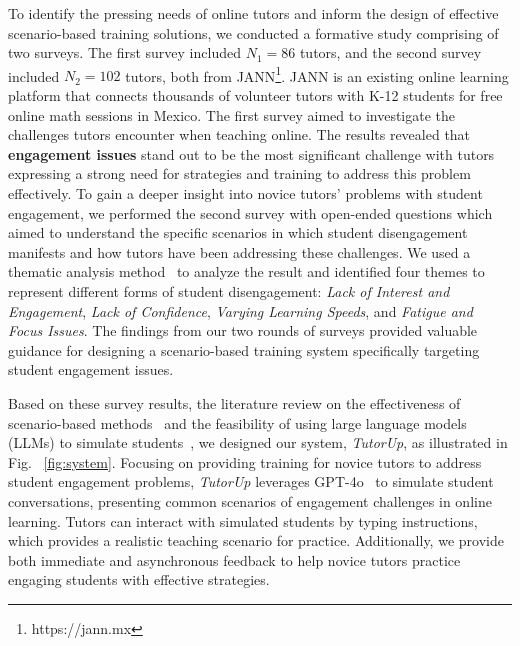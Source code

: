 To identify the pressing needs of online tutors and inform the design of effective scenario-based training solutions, we conducted a formative study comprising of two surveys. The first survey included $N_1 = 86$ tutors, and the second survey included $N_2 = 102$ tutors, both from JANN\footnote{https://jann.mx}. JANN is an existing online learning platform that connects thousands of volunteer tutors with K-12 students for free online math sessions in Mexico. The first survey aimed to investigate the challenges tutors encounter when teaching online. The results revealed that \textbf{engagement issues} stand out to be the most significant challenge with tutors expressing a strong need for strategies and training to address this problem effectively.
To gain a deeper insight into novice tutors' problems with student engagement, we performed the second survey with open-ended questions which aimed to understand the specific scenarios in which student disengagement manifests and how tutors have been addressing these challenges. We used a thematic analysis method~\cite{joffe2011thematic} to analyze the result and identified four themes to represent different forms of student disengagement: \textit{Lack of Interest and Engagement}, \textit{Lack of Confidence}, \textit{Varying Learning Speeds}, and \textit{Fatigue and Focus Issues}. The findings from our two rounds of surveys provided valuable guidance for designing a scenario-based training system specifically targeting student engagement issues.

Based on these survey results, the literature review on the effectiveness of scenario-based methods~\cite{clark2009accelerating,preservice,grossman2008back,adapting,scenariobased,prospectsforchange} and the feasibility of using large language models (LLMs) to simulate students~\cite{gpteach}, we designed our system, \textit{TutorUp}, as illustrated in Fig. ~\ref{fig:system}. Focusing on providing training for novice tutors to address student engagement problems, \textit{TutorUp} leverages GPT-4o~\cite{openai2023chatgpt4} to simulate student conversations, presenting common scenarios of engagement challenges in online learning. Tutors can interact with simulated students by typing instructions, which provides a realistic teaching scenario for practice. Additionally, we provide both immediate and asynchronous feedback to help novice tutors practice engaging students with effective strategies. 


